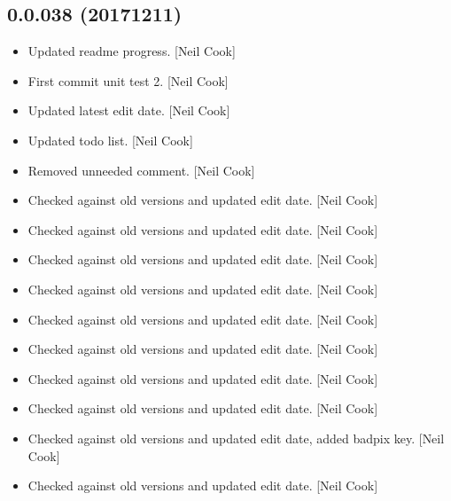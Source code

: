 \documentclass[a4paper,10pt,english]{report}
\begin{document}
\subsection{0.0.038 (2017\sphinxhyphen{}12\sphinxhyphen{}11)}
\label{\detokenize{misc/changelog:id533}}\begin{itemize}
\item {} 
Updated readme progress. {[}Neil Cook{]}

\item {} 
First commit unit test 2. {[}Neil Cook{]}

\item {} 
Updated latest edit date. {[}Neil Cook{]}

\item {} 
Updated todo list. {[}Neil Cook{]}

\item {} 
Removed unneeded comment. {[}Neil Cook{]}

\item {} 
Checked against old versions and updated edit date. {[}Neil Cook{]}

\item {} 
Checked against old versions and updated edit date. {[}Neil Cook{]}

\item {} 
Checked against old versions and updated edit date. {[}Neil Cook{]}

\item {} 
Checked against old versions and updated edit date. {[}Neil Cook{]}

\item {} 
Checked against old versions and updated edit date. {[}Neil Cook{]}

\item {} 
Checked against old versions and updated edit date. {[}Neil Cook{]}

\item {} 
Checked against old versions and updated edit date. {[}Neil Cook{]}

\item {} 
Checked against old versions and updated edit date. {[}Neil Cook{]}

\item {} 
Checked against old versions and updated edit date, added badpix key.
{[}Neil Cook{]}

\item {} 
Checked against old versions and updated edit date. {[}Neil Cook{]}

\end{itemize}
\end{document}
